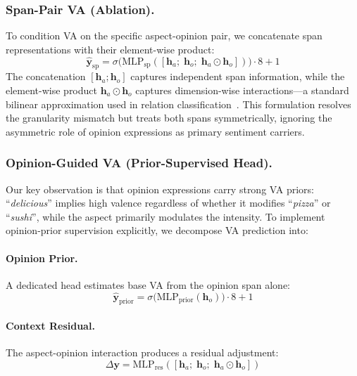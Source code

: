 \documentclass[runningheads]{llncs}
\begin{document}
\subsubsection{Span-Pair VA (Ablation).}
To condition VA on the specific aspect-opinion pair, we concatenate span representations with their element-wise product:
\begin{equation}
    \hat{\mathbf{y}}_{\text{sp}} = \sigma\big(\text{MLP}_{\text{sp}}([\mathbf{h}_a;\; \mathbf{h}_o;\; \mathbf{h}_a \odot \mathbf{h}_o])\big) \cdot 8 + 1
    \label{eq:spanpair}
\end{equation}
The concatenation $[\mathbf{h}_a;\mathbf{h}_o]$ captures independent span information, while the element-wise product $\mathbf{h}_a \odot \mathbf{h}_o$ captures dimension-wise interactions---a standard bilinear approximation used in relation classification~\cite{li2019unified}. This formulation resolves the granularity mismatch but treats both spans symmetrically, ignoring the asymmetric role of opinion expressions as primary sentiment carriers.

\subsubsection{Opinion-Guided VA (Prior-Supervised Head).}
Our key observation is that opinion expressions carry strong VA priors: ``\emph{delicious}'' implies high valence regardless of whether it modifies ``\emph{pizza}'' or ``\emph{sushi}'', while the aspect primarily modulates the intensity. To implement opinion-prior supervision explicitly, we decompose VA prediction into:

\paragraph{Opinion Prior.} A dedicated head estimates base VA from the opinion span alone:
\begin{equation}
    \hat{\mathbf{y}}_{\text{prior}} = \sigma\big(\text{MLP}_{\text{prior}}(\mathbf{h}_o)\big) \cdot 8 + 1
    \label{eq:prior}
\end{equation}

\paragraph{Context Residual.} The aspect-opinion interaction produces a residual adjustment:
\begin{equation}
    \Delta\mathbf{y} = \text{MLP}_{\text{res}}([\mathbf{h}_a;\; \mathbf{h}_o;\; \mathbf{h}_a \odot \mathbf{h}_o])
    \label{eq:residual}
\end{equation}
\end{document}

